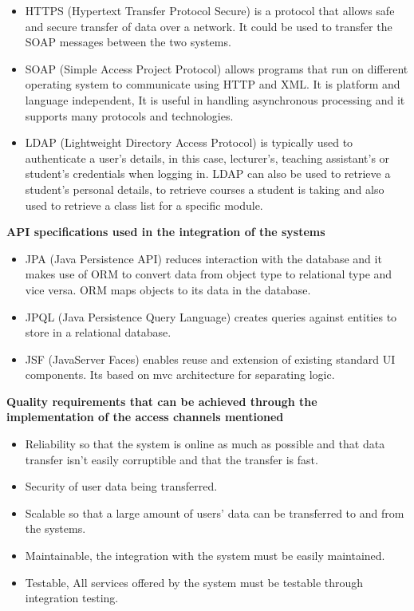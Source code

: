 \documentclass[a4paper]{article}
\begin{document}
\begin{itemize}
	\item HTTPS (Hypertext Transfer Protocol Secure) is a protocol that allows safe and secure transfer of data over a network. It could be used to transfer the SOAP messages between the two systems.
	\item SOAP (Simple Access Project Protocol) allows programs that run on different operating system to communicate using HTTP and XML. It is platform and language independent, It is useful in handling asynchronous processing and it supports many protocols and technologies.
	\item LDAP (Lightweight Directory Access Protocol) is typically  used to authenticate a user’s details, in this case, lecturer’s, teaching assistant’s or student’s credentials when logging in. LDAP can also be used to retrieve a student’s personal details, to retrieve courses a student is taking and also used to retrieve a class list for a specific module.
\end{itemize}
\textbf{API specifications used in the integration of the systems}
\begin{itemize}
	\item JPA (Java Persistence API) reduces interaction with the database and it makes use of ORM to convert data from object type to relational type and vice versa. ORM maps objects to its data in the database.
	\item JPQL (Java Persistence Query Language) creates queries against entities to store in a relational database.
	\item JSF (JavaServer Faces) enables reuse and extension of existing standard UI components. Its based on mvc architecture for separating logic.
\end{itemize}
\textbf{Quality requirements that can be achieved through the implementation of the access channels mentioned}
\begin{itemize}
	\item Reliability so that the system is online as much as possible and that data transfer isn’t easily corruptible and that the transfer is fast.
	\item Security of user data being transferred.
	\item Scalable so that a large amount of users’ data can be transferred to and from the systems.
	\item Maintainable, the integration with the system must be easily maintained.
	\item Testable, All services offered by the system must be testable through integration testing.
\end{itemize}
\end{document}
